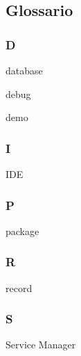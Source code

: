 \subsection*{Glossario}
\subsubsection*{D}
database

debug

demo
\subsubsection*{I}
IDE
\subsubsection*{P}
package
\subsubsection*{R}
record
\subsubsection*{S}
Service Manager